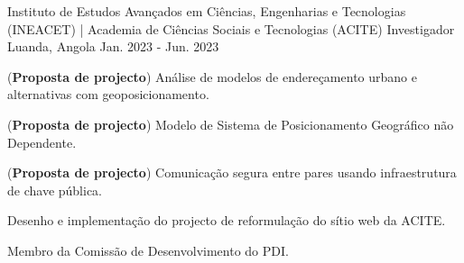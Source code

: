 \begin{cventries}
\cventry
{Instituto de Estudos Avançados em Ciências, Engenharias e Tecnologias (INEACET) | Academia de Ciências Sociais e Tecnologias (ACITE)} %
{Investigador} %
{Luanda, Angola} %
{Jan. 2023 - Jun. 2023} %
{ %
\begin{cvitems}
    \item (\textbf{Proposta de projecto}) Análise de modelos de endereçamento urbano e alternativas com geoposicionamento.
    \item (\textbf{Proposta de projecto}) Modelo de Sistema de Posicionamento Geográfico não Dependente.
    \item (\textbf{Proposta de projecto}) Comunicação segura entre pares usando infraestrutura de chave pública.
    \item Desenho e implementação do projecto de reformulação do sítio web da ACITE.
    \item Membro da Comissão de Desenvolvimento do PDI.
\end{cvitems}
}



\end{cventries}
